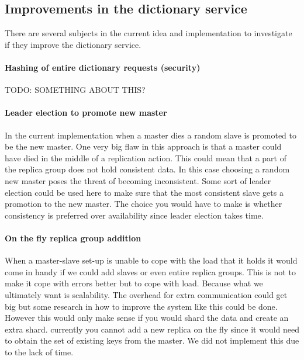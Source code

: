 \documentclass[12pt,a4paper]{scrartcl}
\begin{document}

\subsection{Improvements in the dictionary service}
There are several subjects in the current idea and implementation to investigate if they improve the dictionary service.

\paragraph{Hashing of entire dictionary requests (security)}
TODO: SOMETHING ABOUT THIS?

\paragraph{Leader election to promote new master}
In the current implementation when a master dies a random slave is promoted to be the new master. One very big flaw in this approach is that a master could have died in the middle of a replication action. This could mean that a part of the replica group does not hold consistent data. In this case choosing a random new master poses the threat of becoming inconsistent. Some sort of leader election could be used here to make sure that the most consistent slave gets a promotion to the new master. The choice you would have to make is whether consistency is preferred over availability since leader election takes time.

\paragraph{On the fly replica group addition}
When a master-slave set-up is unable to cope with the load that it holds it would come in handy if we could add slaves or even entire replica groups. This is not to make it cope with errors better but to cope with load. Because what we ultimately want is scalability. The overhead for extra communication could get big but some research in how to improve the system like this could be done. However this would only make sense if you would shard the data and create an extra shard. currently you cannot add a new replica on the fly since it would need to obtain the set of existing keys from the master. We did not implement this due to the lack of time.
\end{document}
